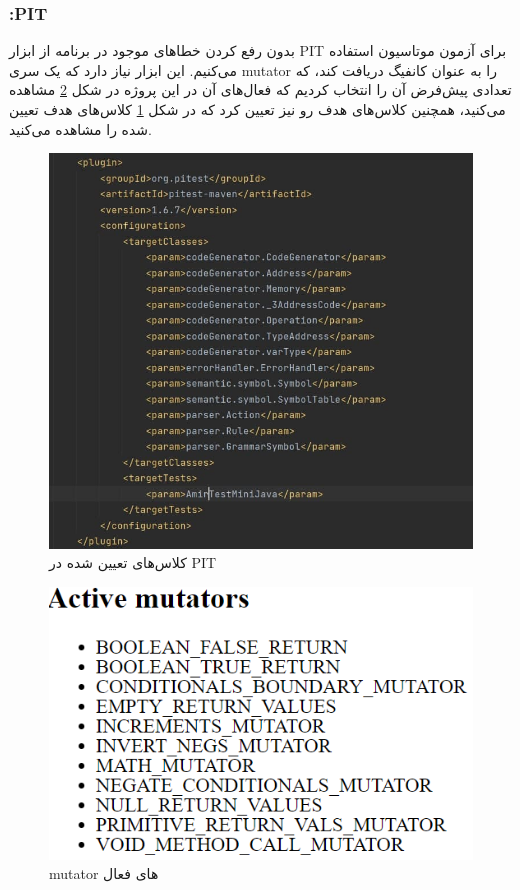 \subsubsection{:PIT}

بدون رفع کردن خطاهای موجود در برنامه از ابزار PIT برای آزمون موتاسیون استفاده می‌کنیم. این ابزار نیاز دارد که یک سری mutator را به عنوان کانفیگ دریافت کند، که تعدادی پیش‌فرض آن را انتخاب کردیم که فعال‌های آن در این پروژه در شکل \ref{fig:9} مشاهده می‌کنید، همچنین کلاس‌های هدف رو نیز تعیین کرد که در شکل \ref{fig:8} کلاس‌های هدف تعیین شده را مشاهده می‌کنید.
\begin{figure}[ht]
\centering
\includegraphics[scale=0.5]{PIT1.jpg}
\caption{کلاس‌های تعیین شده در PIT}
\label{fig:8}
\end{figure}

\begin{figure}[ht]
\centering
\includegraphics[scale=0.8]{PIT2.png}
\caption{mutator های فعال}
\label{fig:9}
\end{figure}


